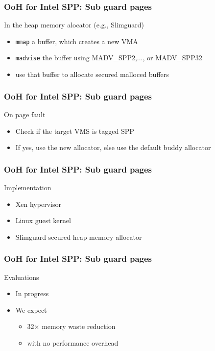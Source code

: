 \documentclass[xcolor=table,bigger,unknownkeysallowed]{beamer}
\begin{document}
        \begin{frame}
        \frametitle{OoH for Intel SPP: Sub guard pages} 
			\begin{block}{In the heap memory alocator (e.g., Slimguard)}			
				\begin{itemize}					
					\item \texttt{mmap} a buffer, which creates a new VMA
					\item \texttt{madvise} the buffer using MADV\_SPP2,..., or MADV\_SPP32
					\item use that buffer to allocate secured malloced buffers 
				\end{itemize}
			\end{block}					
        \end{frame}  
        \begin{frame}
        \frametitle{OoH for Intel SPP: Sub guard pages} 
			\begin{block}{On page fault}			
				\begin{itemize}
					\item Check if the target VMS is tagged SPP
					\item If yes, use the new allocator, else use the default buddy allocator
				\end{itemize}
			\end{block}					
        \end{frame} 
        \begin{frame}
        \frametitle{OoH for Intel SPP: Sub guard pages} 
			\begin{block}{Implementation}			
				\begin{itemize}
					\item Xen hypervisor
					\item Linux guest kernel
					\item Slimguard secured heap memory allocator
				\end{itemize}
			\end{block}					
        \end{frame} 
        \begin{frame}
        \frametitle{OoH for Intel SPP: Sub guard pages} 
			\begin{block}{Evaluations}			
				\begin{itemize}
					\item In progress
					\item We expect
					\begin{itemize}
						\item 32$\times$ memory waste reduction
						\item with no performance overhead
					\end{itemize}
				\end{itemize}
			\end{block}					
        \end{frame}         
\end{document}
